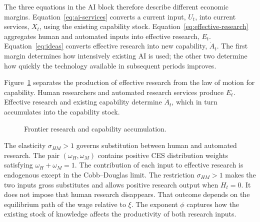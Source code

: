 The three equations in the AI block therefore describe different economic margins.
Equation~\eqref{eq:ai-services} converts a current input, $U_t$, into current services,
$X_t$, using the existing capability stock. Equation~\eqref{eq:effective-research}
aggregates human and automated inputs into effective research, $E_t$.
Equation~\eqref{eq:ideas} converts effective research into new capability, $\dot A_t$.
The first margin determines how intensively existing AI is used; the other two
determine how quickly the technology available in subsequent periods improves.

Figure~\ref{fig:research-flow} separates the production of effective research from
the law of motion for capability. Human researchers and automated research services
produce $E_t$. Effective research and existing capability determine $\dot A_t$, which
in turn accumulates into the capability stock.

\begin{figure}[H]
    \centering
    \caption{Frontier research and capability accumulation.}
    \label{fig:research-flow}
\end{figure}

The elasticity $\sigma_{HM}>1$ governs substitution between human and automated
research. The pair $(\omega_H,\omega_M)$ contains positive CES distribution weights
satisfying $\omega_H+\omega_M=1$. The contribution of each input to effective research
is endogenous except in the Cobb--Douglas limit.
The restriction $\sigma_{HM}>1$ makes the two inputs gross substitutes and allows
positive research output when $H_t=0$. It does not impose that human research
disappears. That outcome depends on the equilibrium path of the wage relative to
$\xi$. The exponent $\phi$ captures how the existing stock of knowledge affects the
productivity of both research inputs.

